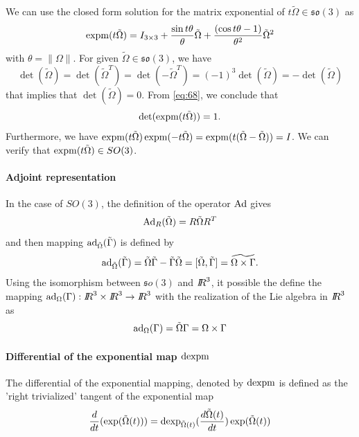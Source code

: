 We can use the closed form solution for the matrix exponential of $t \tilde\Omega  \in \mathfrak{so}(3)$ as
\begin{equation}
  \label{eq:68}
  \operatorname{expm}(t\tilde\Omega) = I_{3\times 3} + \frac{\sin{t\theta}} {\theta}  \tilde\Omega  +  \frac{(\cos{t \theta}-1)}{\theta^2} \tilde\Omega^2
\end{equation}
with $\theta = \|\Omega\|$.
For given  $\tilde \Omega \in\mathfrak{so}(3)$, we have
\begin{equation}
  \label{eq:69}
  \det(\tilde \Omega) = \det(\tilde \Omega^T) = \det (-\tilde \Omega^T) = (-1)^3 \det(\tilde \Omega ) = - \det (\tilde \Omega )
\end{equation}
that implies that $\det(\tilde \Omega ) =0 $. From \eqref{eq:68}, we conclude that
\begin{equation}
  \label{eq:70}
  \det( \operatorname{expm}(t\tilde \Omega)) = 1.
\end{equation}
Furthermore, we have $\operatorname{expm}(t\tilde \Omega)\operatorname{expm}( -t\tilde \Omega) = \operatorname{expm}(t(\tilde \Omega-\tilde \Omega)) = I$. We can verify  that  $\operatorname{expm}(t\tilde \Omega) \in SO(3)$.

\paragraph{Adjoint representation}
In the case of $SO(3)$, the definition of the operator $\operatorname{Ad}$ gives
\begin{equation}
  \label{eq:121}
  \operatorname{Ad}_R(\tilde\Omega)  = R \tilde\Omega R^T
\end{equation}
 and then mapping $\operatorname{ad}_{\tilde\Omega}(\tilde \Gamma)$ is defined by
\begin{equation}
  \label{eq:56}
  \operatorname{ad}_{\tilde\Omega}(\tilde\Gamma) = \tilde \Omega \tilde\Gamma - \tilde \Gamma \tilde\Omega  =  [\tilde \Omega,\tilde \Gamma] = \widetilde{\Omega \times \Gamma}.
\end{equation}
Using the isomorphism between $\mathfrak so(3)$ and $\mbox{\rm $I\!\!R$}^3$, it possible the define the mapping $\operatorname{ad}_{\Omega}(\Gamma) : \mbox{\rm $I\!\!R$}^3\times\mbox{\rm $I\!\!R$}^3 \rightarrow \mbox{\rm $I\!\!R$}^3$ with the realization of the Lie algebra in $\mbox{\rm $I\!\!R$}^3$ as
\begin{equation}
  \label{eq:55}
  \operatorname{ad}_\Omega(\Gamma) = \tilde\Omega \Gamma = \Omega\times\Gamma
\end{equation}

\paragraph{Differential of the exponential map $\operatorname{dexpm}$}
The differential of the exponential mapping, denoted by $\operatorname{dexpm}$ is defined as the 'right trivialized' tangent of the exponential map
\begin{equation}
  \label{eq:71}
  \frac{d}{dt} (\exp(\tilde \Omega(t))) = \operatorname{dexp}_{\tilde\Omega(t)}(\frac{d \tilde{\Omega}(t)}{dt}) \exp(\tilde\Omega(t))
\end{equation}



